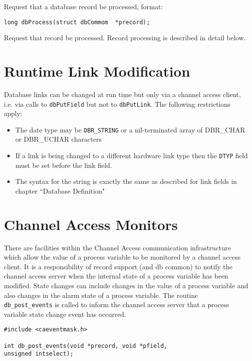 Request that a database record be processed, format:

\begin{verbatim}
long dbProcess(struct dbCommom  *precord);
\end{verbatim}

Request that record be processed.
Record processing is described in detail below.

\section{Runtime Link Modification}

Database links can be changed at run time but only via a channel access client, i.e. via calls to \verb|dbPutField| but not to \verb|dbPutLink|.
The following restrictions apply:

\begin{itemize}
\item The date type may be \verb|DBR_STRING| or a nil-terminated array of DBR\_CHAR or DBR\_UCHAR characters

\item If a link is being changed to a different hardware link type then the \verb|DTYP| field must be set before the link field.

\item The syntax for the string is exactly the same as described for link fields in chapter ``Database Definition"

\end{itemize}

\section{Channel Access Monitors}

There are facilities within the Channel Access communication infrastructure which allow the value of a process variable to be monitored by a channel access client.
It is a responsibility of record support (and db common) to notify the channel access server when the internal state of a process variable has been modified.
State changes can include changes in the value of a process variable and also changes in the alarm state of a process variable.
The routine \verb|db_post_events| is called to inform the channel access server that a process variable state change event has occurred.

\begin{verbatim}
#include <caeventmask.h>

int db_post_events(void *precord, void *pfield,
unsigned intselect);
\end{verbatim}

